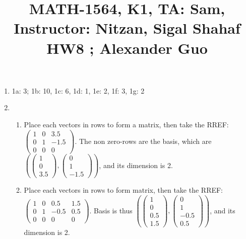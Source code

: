 \documentclass{article}
\title{\large{\vspace{-1.0cm}MATH-1564, K1, TA: Sam, Instructor: Nitzan, Sigal Shahaf \\ HW8 ; Alexander Guo}}
\date{}
\begin{document}
\maketitle

\vspace{-1.5cm}
\large

\begin{enumerate}

\item 1a: 3; 1b: 10, 1c: 6, 1d: 1, 1e: 2, 1f: 3, 1g: 2

\item

\begin{enumerate}

\item Place each vectors in rows to form a matrix, then take the RREF: $\left(\begin{array}{ccc} 1 & 0 & 3.5 \\ 0 & 1 & -1.5 \\ 0 & 0 & 0 \end{array}\right)$. The non zero-rows are the basis, which are $\left(\left(\begin{array}{c} 1 \\ 0 \\ 3.5 \end{array}\right), \left(\begin{array}{c} 0 \\ 1 \\ -1.5 \end{array}\right)\right)$, and its dimension is 2.

\item Place each vectors in rows to form matrix, then take the RREF:  $\left(\begin{array}{cccc} 1 & 0 & 0.5 & 1.5 \\ 0 & 1 & -0.5 & 0.5 \\ 0 & 0 & 0 & 0 \end{array}\right)$. Basis is thus $\left(\left(\begin{array}{c} 1 \\ 0 \\ 0.5 \\ 1.5 \end{array}\right), \left(\begin{array}{c} 0 \\ 1 \\ -0.5 \\ 0.5 \end{array}\right)\right)$, and its dimension is 2.


\end{enumerate}
\end{enumerate}
\end{document}
